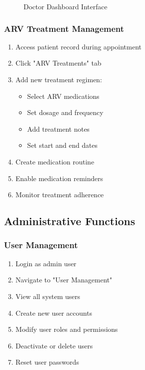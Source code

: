 \documentclass[12pt,a4paper]{article}
\begin{document}
\begin{figure}[H]
\centering
{}
\caption{Doctor Dashboard Interface}
\end{figure}

\subsubsection{ARV Treatment Management}

\begin{enumerate}
    \item Access patient record during appointment
    \item Click "ARV Treatments" tab
    \item Add new treatment regimen:
    \begin{itemize}
        \item Select ARV medications
        \item Set dosage and frequency
        \item Add treatment notes
        \item Set start and end dates
    \end{itemize}
    \item Create medication routine
    \item Enable medication reminders
    \item Monitor treatment adherence
\end{enumerate}

\subsection{Administrative Functions}

\subsubsection{User Management}

\begin{enumerate}
    \item Login as admin user
    \item Navigate to "User Management"
    \item View all system users
    \item Create new user accounts
    \item Modify user roles and permissions
    \item Deactivate or delete users
    \item Reset user passwords
\end{enumerate}
\end{document}

